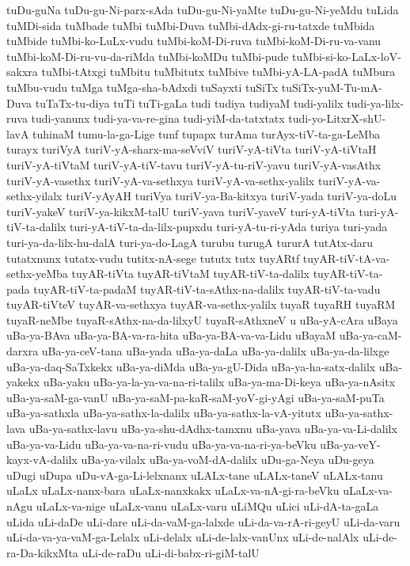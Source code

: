 {tuDu-guNa
tuDu-gu-Ni-parx-sAda
tuDu-gu-Ni-yaMte
tuDu-gu-Ni-yeMdu
tuLida
tuMDi-sida
tuMbade
tuMbi
tuMbi-Duva
tuMbi-dAdx-gi-ru-tatxde
tuMbida
tuMbide
tuMbi-ko-LuLx-vudu
tuMbi-koM-Di-ruva
tuMbi-koM-Di-ru-va-vanu
tuMbi-koM-Di-ru-vu-da-riMda
tuMbi-koMDu
tuMbi-pude
tuMbi-si-ko-LaLx-loV-sakxra
tuMbi-tAtxgi
tuMbitu
tuMbitutx
tuMbive
tuMbi-yA-LA-padA
tuMbura
tuMbu-vudu
tuMga
tuMga-sha-bAdxdi
tuSayxti
tuSiTx
tuSiTx-yuM-Tu-mA-Duva
tuTaTx-tu-diya
tuTi
tuTi-gaLa
tudi
tudiya
tudiyaM
tudi-yalilx
tudi-ya-lilx-ruva
tudi-yanunx
tudi-ya-va-re-gina
tudi-yiM-da-tatxtatx
tudi-yo-LitxrX-shU-lavA
tuhinaM
tumu-la-ga-Lige
tunf
tupapx
turAma
turAyx-tiV-ta-ga-LeMba
turayx
turiVyA
turiV-yA-sharx-ma-seVviV
turiV-yA-tiVta
turiV-yA-tiVtaH
turiV-yA-tiVtaM
turiV-yA-tiV-tavu
turiV-yA-tu-riV-yavu
turiV-yA-vasAthx
turiV-yA-vasethx
turiV-yA-va-sethxya
turiV-yA-va-sethx-yalilx
turiV-yA-va-sethx-yilalx
turiV-yAyAH
turiVya
turiV-ya-Ba-kitxya
turiV-yada
turiV-ya-doLu
turiV-yakeV
turiV-ya-kikxM-talU
turiV-yava
turiV-yaveV
turi-yA-tiVta
turi-yA-tiV-ta-dalilx
turi-yA-tiV-ta-da-lilx-pupxdu
turi-yA-tu-ri-yAda
turiya
turi-yada
turi-ya-da-lilx-hu-dalA
turi-ya-do-LagA
turubu
turugA
tururA
tutAtx-daru
tutatxnunx
tutatx-vudu
tutitx-nA-sege
tututx
tutx
tuyARtf
tuyAR-tiV-tA-va-sethx-yeMba
tuyAR-tiVta
tuyAR-tiVtaM
tuyAR-tiV-ta-dalilx
tuyAR-tiV-ta-pada
tuyAR-tiV-ta-padaM
tuyAR-tiV-ta-sAthx-na-dalilx
tuyAR-tiV-ta-vadu
tuyAR-tiVteV
tuyAR-va-sethxya
tuyAR-va-sethx-yalilx
tuyaR
tuyaRH
tuyaRM
tuyaR-neMbe
tuyaR-sAthx-na-da-lilxyU
tuyaR-sAthxneV
u
uBa-yA-cAra
uBaya
uBa-ya-BAva
uBa-ya-BA-va-ra-hita
uBa-ya-BA-va-va-Lidu
uBayaM
uBa-ya-caM-darxra
uBa-ya-ceV-tana
uBa-yada
uBa-ya-daLa
uBa-ya-dalilx
uBa-ya-da-lilxge
uBa-ya-daq-SaTxkekx
uBa-ya-diMda
uBa-ya-gU-Dida
uBa-ya-ha-satx-dalilx
uBa-yakekx
uBa-yaku
uBa-ya-la-ya-va-na-ri-talilx
uBa-ya-ma-Di-keya
uBa-ya-nAsitx
uBa-ya-saM-ga-vanU
uBa-ya-saM-pa-kaR-saM-yoV-gi-yAgi
uBa-ya-saM-puTa
uBa-ya-sathxla
uBa-ya-sathx-la-dalilx
uBa-ya-sathx-la-vA-yitutx
uBa-ya-sathx-lava
uBa-ya-sathx-lavu
uBa-ya-shu-dAdhx-tamxnu
uBa-yava
uBa-ya-va-Li-dalilx
uBa-ya-va-Lidu
uBa-ya-va-na-ri-vudu
uBa-ya-va-na-ri-ya-beVku
uBa-ya-veY-kayx-vA-dalilx
uBa-ya-vilalx
uBa-ya-voM-dA-dalilx
uDu-ga-Neya
uDu-geya
uDugi
uDupa
uDu-vA-ga-Li-lelxnanx
uLALx-tane
uLALx-taneV
uLALx-tanu
uLaLx
uLaLx-nanx-bara
uLaLx-nanxkakx
uLaLx-va-nA-gi-ra-beVku
uLaLx-va-nAgu
uLaLx-va-nige
uLaLx-vanu
uLaLx-varu
uLiMQu
uLici
uLi-dA-ta-gaLa
uLida
uLi-daDe
uLi-dare
uLi-da-vaM-ga-lalxde
uLi-da-va-rA-ri-geyU
uLi-da-varu
uLi-da-va-ya-vaM-ga-Lelalx
uLi-delalx
uLi-de-lalx-vanUnx
uLi-de-nalAlx
uLi-de-ra-Da-kikxMta
uLi-de-raDu
uLi-di-babx-ri-giM-talU
}
